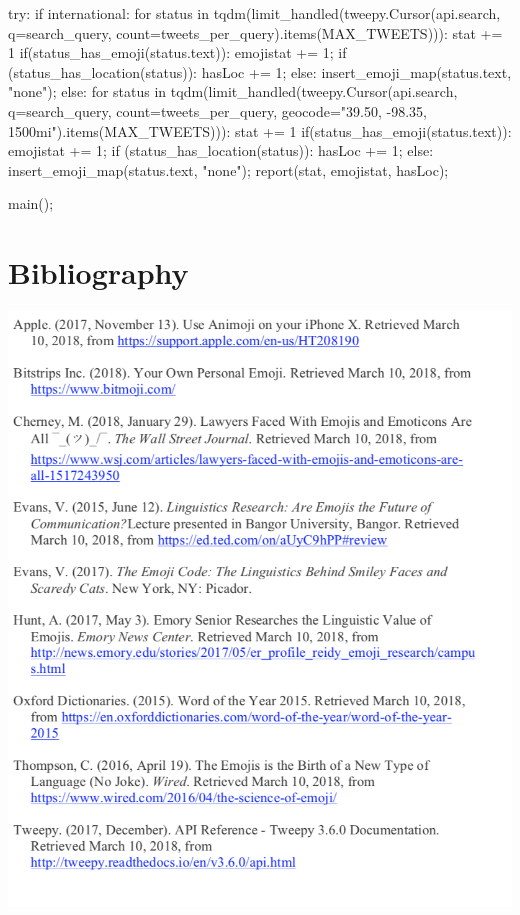 \documentclass[a4paper,12pt]{article}
\begin{document}
\begin{python}
    try:
        if international:
            for status in tqdm(limit_handled(tweepy.Cursor(api.search, 
            q=search_query, count=tweets_per_query).items(MAX_TWEETS))):
                stat += 1
                if(status_has_emoji(status.text)):
                    emojistat += 1;
                    if (status_has_location(status)):
                        hasLoc += 1;
                    else:
                        insert_emoji_map(status.text, "none");
        else:
            for status in tqdm(limit_handled(tweepy.Cursor(api.search, 
            q=search_query, count=tweets_per_query, geocode="39.50,
            -98.35, 1500mi").items(MAX_TWEETS))):
                stat += 1
                if(status_has_emoji(status.text)):
                    emojistat += 1;
                    if (status_has_location(status)):
                        hasLoc += 1;
                    else:
                        insert_emoji_map(status.text, "none");
    report(stat, emojistat, hasLoc);

main();
\end{python}

\pagebreak
\section{Bibliography}
\includegraphics[scale=1.1]{bib.png}
\end{document}
